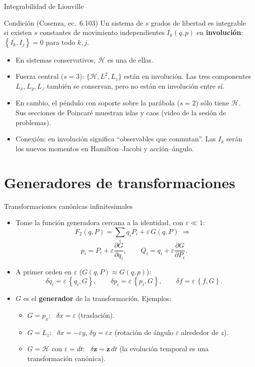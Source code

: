 \documentclass[spanish]{beamer}
\newcommand{\Ham}{\mathcal{H}}
\newcommand{\pd}[2]{\frac{\partial #1}{\partial #2}}
\newcommand{\pb}[2]{\left\{#1,#2\right\}}   %
\begin{document}
\begin{frame}{Integrabilidad de Liouville}
\begin{block}{Condición (Cosenza, ec.~6.103)}
Un sistema de $s$ grados de libertad es integrable si existen $s$ constantes de
movimiento independientes $I_k(q,p)$ en \textbf{involución}:
$\pb{I_k}{I_j} = 0$ para todo $k,j$.
\end{block}
\begin{itemize}
  \item<2-> En sistemas conservativos, $\Ham$ es una de ellas.
  \item<3-> Fuerza central ($s=3$): $\{\Ham, L^2, L_z\}$ están en involución.
        Las tres componentes $L_x, L_y, L_z$ también se conservan, pero no están en
        involución entre sí.
  \item<4-> En cambio, el péndulo con soporte sobre la parábola ($s=2$) sólo
        tiene $\Ham$. Sus secciones de Poincaré muestran islas y caos
        (video de la sesión de problemas).
  \item<5-> Conexión: en involución significa ``observables que conmutan''. Las $I_k$
        serán los nuevos momentos en Hamilton--Jacobi y acción--ángulo.
\end{itemize}
\end{frame}

\section{Generadores de transformaciones}

\begin{frame}{Transformaciones canónicas infinitesimales}
\begin{itemize}
  \item<1-> Tome la función generadora cercana a la identidad, con $\varepsilon\ll 1$:
  \[
    F_2(q,P) = \sum_i q_iP_i + \varepsilon\,G(q,P)
    \;\Rightarrow\;
  \]
  \[
    p_i = P_i + \varepsilon\pd{G}{q_i},\qquad Q_i = q_i + \varepsilon\pd{G}{P_i}.
  \]
  \item<2-> A primer orden en $\varepsilon$ ($G(q,P)\approx G(q,p)$):
  \[
    \delta q_i = \varepsilon\,\pb{q_i}{G}, \qquad
    \delta p_i = \varepsilon\,\pb{p_i}{G}, \qquad
    \delta f = \varepsilon\,\pb{f}{G} .
  \]
  \item<3-> $G$ es el \textbf{generador} de la transformación. Ejemplos:
  \begin{itemize}
    \item $G=p_x$: \ $\delta x = \varepsilon$ (traslación).
    \item $G=L_z$: \ $\delta x = -\varepsilon y$, $\delta y = \varepsilon x$
          (rotación de ángulo $\varepsilon$ alrededor de $z$).
    \item $G=\Ham$ con $\varepsilon = dt$: \ $\delta\mathbf z = \dot{\mathbf z}\,dt$
          (la evolución temporal es una transformación canónica).
  \end{itemize}
\end{itemize}
\end{frame}
\end{document}
